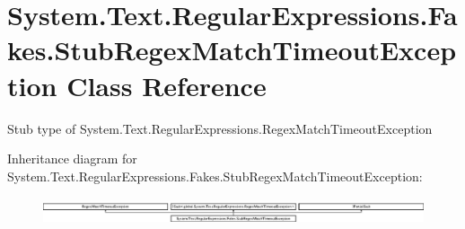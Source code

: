 \hypertarget{class_system_1_1_text_1_1_regular_expressions_1_1_fakes_1_1_stub_regex_match_timeout_exception}{\section{System.\-Text.\-Regular\-Expressions.\-Fakes.\-Stub\-Regex\-Match\-Timeout\-Exception Class Reference}
\label{class_system_1_1_text_1_1_regular_expressions_1_1_fakes_1_1_stub_regex_match_timeout_exception}
}


Stub type of System.\-Text.\-Regular\-Expressions.\-Regex\-Match\-Timeout\-Exception 


Inheritance diagram for System.\-Text.\-Regular\-Expressions.\-Fakes.\-Stub\-Regex\-Match\-Timeout\-Exception\-:\begin{figure}[H]
\begin{center}
\leavevmode
\includegraphics[height=0.802867cm]{class_system_1_1_text_1_1_regular_expressions_1_1_fakes_1_1_stub_regex_match_timeout_exception}
\end{center}
\end{figure}
